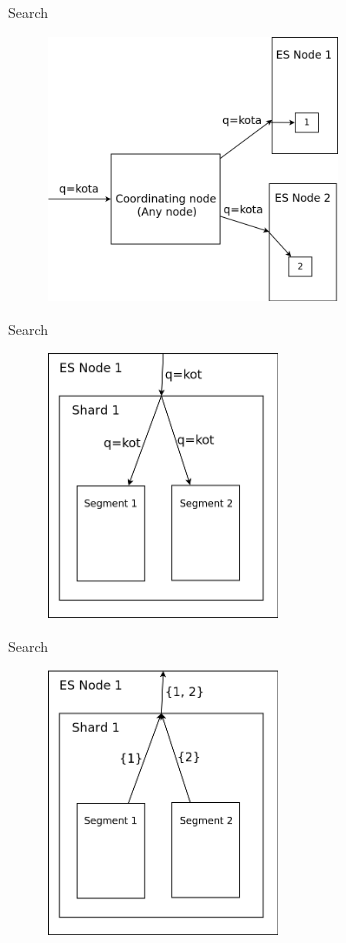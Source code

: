 \documentclass{beamer}
\begin{document}
\begin{frame}{Search}
	\begin{figure}
		\includegraphics[width=\textwidth,height=7cm,keepaspectratio=true]{search1}
	\end{figure}
\end{frame}
\begin{frame}{Search}
	\begin{figure}
		\includegraphics[width=\textwidth,height=7cm,keepaspectratio=true]{search5}
	\end{figure}
\end{frame}
\begin{frame}{Search}
	\begin{figure}
		\includegraphics[width=\textwidth,height=7cm,keepaspectratio=true]{search6}
	\end{figure}
\end{frame}
\end{document}
